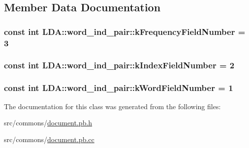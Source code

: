 \subsection{Member Data Documentation}
\hypertarget{class_l_d_a_1_1word__ind__pair_abe2c7f5b4c07012fef28c04c3daf7420}{
\subsubsection[{kFrequencyFieldNumber}]{\setlength{\rightskip}{0pt plus 5cm}const int {\bf LDA::word\_\-ind\_\-pair::kFrequencyFieldNumber} = 3}}
\label{class_l_d_a_1_1word__ind__pair_abe2c7f5b4c07012fef28c04c3daf7420}
\hypertarget{class_l_d_a_1_1word__ind__pair_a73654f22613eeb3b1d759830a2f884e2}{
\subsubsection[{kIndexFieldNumber}]{\setlength{\rightskip}{0pt plus 5cm}const int {\bf LDA::word\_\-ind\_\-pair::kIndexFieldNumber} = 2}}
\label{class_l_d_a_1_1word__ind__pair_a73654f22613eeb3b1d759830a2f884e2}
\hypertarget{class_l_d_a_1_1word__ind__pair_a9fc278e2b803654eb8daf2b6bd7e4e12}{
\subsubsection[{kWordFieldNumber}]{\setlength{\rightskip}{0pt plus 5cm}const int {\bf LDA::word\_\-ind\_\-pair::kWordFieldNumber} = 1}}
\label{class_l_d_a_1_1word__ind__pair_a9fc278e2b803654eb8daf2b6bd7e4e12}


The documentation for this class was generated from the following files:\begin{DoxyCompactItemize}
\item 
src/commons/\hyperlink{document_8pb_8h}{document.pb.h}\item 
src/commons/\hyperlink{document_8pb_8cc}{document.pb.cc}\end{DoxyCompactItemize}
